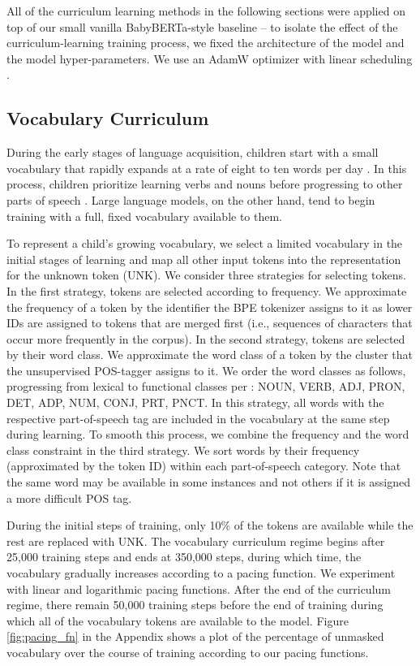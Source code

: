 All of the curriculum learning methods in the following sections were applied on top of our small vanilla BabyBERTa-style baseline -- to isolate the effect of the curriculum-learning training process, we fixed the architecture of the model and the model hyper-parameters. We use an AdamW optimizer with linear scheduling \cite{loshchilov2019decoupled}.


\subsection{Vocabulary Curriculum}
\label{subsec:vocab-cl}

During the early stages of language acquisition, children start with a small vocabulary that rapidly expands at a rate of eight to ten words per day \cite{weizman2001lexical}. In this process, children prioritize learning verbs and nouns before progressing to other parts of speech \cite{bergelson2015early}. Large language models, on the other hand, tend to begin training with a full, fixed vocabulary available to them. 

To represent a child's growing vocabulary, we select a limited vocabulary in the initial stages of learning and map all other input tokens into the representation for the unknown token (\textsc{UNK}). We consider three strategies for selecting tokens. In the first strategy, tokens are selected according to frequency. We approximate the frequency of a token by the identifier the BPE tokenizer assigns to it as lower IDs are assigned to tokens that are merged first (i.e., sequences of characters that occur more frequently in the corpus). In the second strategy, tokens are selected by their word class. We approximate the word class of a token by the cluster that the unsupervised POS-tagger assigns to it. We order the word classes as follows, progressing from lexical to functional classes per \citet{bergelson2015early}: NOUN, VERB, ADJ, PRON, DET, ADP, NUM, CONJ, PRT, PNCT. In this strategy, all words with the respective part-of-speech tag are included in the vocabulary at the same step during learning. To smooth this process, we combine the frequency and the word class constraint in the third strategy.
We sort words by their frequency (approximated by the token ID) within each part-of-speech category. Note that the same word may be available in some instances and not others if it is assigned a more difficult POS tag. 

During the initial steps of training, only 10\% of the tokens are available while the rest are replaced with UNK. The vocabulary curriculum regime begins after 25,000 training steps and ends at 350,000 steps, during which time, the vocabulary gradually increases according to a pacing function. We experiment with linear and logarithmic pacing functions.  After the end of the curriculum regime, there remain 50,000 training steps before the end of training during which all of the vocabulary tokens are available to the model. Figure \ref{fig:pacing_fn} in the Appendix shows a plot of the percentage of unmasked vocabulary over the course of training according to our pacing functions.

